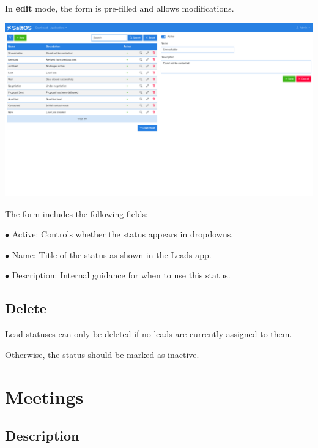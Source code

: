 \documentclass[a4paper]{article}
\begin{document}
In \textbf{edit} mode, the form is pre-filled and allows modifications.

\begin{center}\includegraphics[width=1\textwidth]{../ujest/snaps/test-screenshots-js-screenshots-crm-leads-status-edit-10-en-us-1-snap.png}\end{center}

The form includes the following fields:

\begin{compactitem}
\item[\color{myblue}$\bullet$] Active: Controls whether the status appears in dropdowns.
\item[\color{myblue}$\bullet$] Name: Title of the status as shown in the Leads app.
\item[\color{myblue}$\bullet$] Description: Internal guidance for when to use this status.
\end{compactitem}

\hypertarget{toc65}{}
\subsection{Delete}

Lead statuses can only be deleted if no leads are currently assigned to them.

Otherwise, the status should be marked as inactive.


\hypertarget{toc66}{}
\section{Meetings}

\hypertarget{toc67}{}
\subsection{Description}
\end{document}
